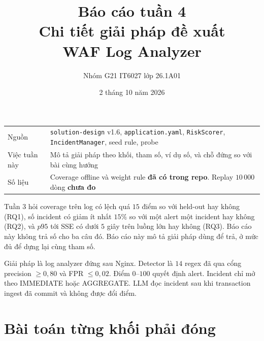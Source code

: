 \documentclass[a4paper,11pt]{article}
\title{\textbf{Báo cáo tuần 4}\\[0.35em]
\large Chi tiết giải pháp đề xuất\\
\large WAF Log Analyzer}
\author{Nhóm G21 \quad IT6027 \quad lớp 26.1A01}
\date{2 tháng 10 năm 2026}
\begin{document}
\maketitle
\thispagestyle{empty}

\begin{center}
\small
\begin{tabular}{@{}ll@{}}
\toprule
Nguồn & \texttt{solution-design} v1.6, \texttt{application.yaml}, \texttt{RiskScorer}, \texttt{IncidentManager}, seed rule, probe \\
Việc tuần này & Mô tả giải pháp theo khối, tham số, ví dụ số, và chỗ đứng so với bài cùng hướng \\
Số liệu & Coverage offline và weight rule \textbf{đã có trong repo}. Replay $10\,000$ dòng \textbf{chưa đo} \\
\bottomrule
\end{tabular}
\end{center}

\vspace{0.6em}
\noindent
Tuần 3 hỏi coverage trên log có lệch quá $15$ điểm so với held-out hay không (RQ1), số incident có giảm ít nhất $15\%$ so với một alert một incident hay không (RQ2), và $p95$ tới SSE có dưới $5$ giây trên luồng lớn hay không (RQ3). Báo cáo này không trả số cho ba câu đó. Báo cáo này mô tả giải pháp dùng để trả, ở mức đủ để dựng lại cùng tham số.

\noindent
Giải pháp là log analyzer đứng sau Nginx. Detector là $14$ regex đã qua cổng precision $\geq 0{,}80$ và FPR $\leq 0{,}02$. Điểm $0$--$100$ quyết định alert. Incident chỉ mở theo IMMEDIATE hoặc AGGREGATE. LLM đọc incident sau khi transaction ingest đã commit và không được đổi điểm.

\section{Bài toán từng khối phải đóng}
\end{document}
